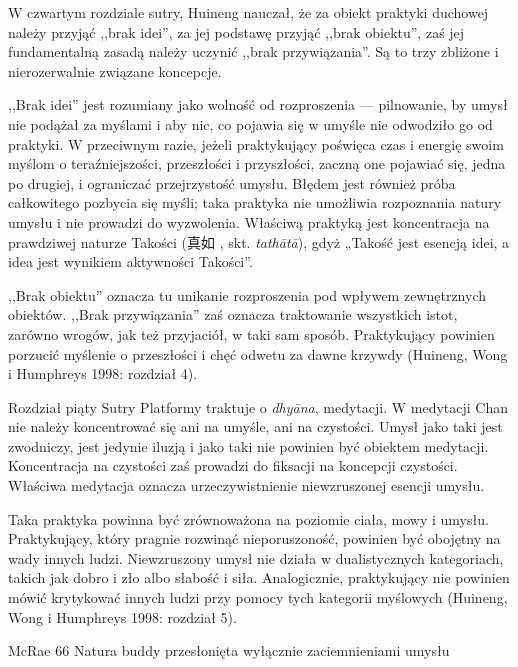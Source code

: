 W czwartym rozdziale sutry, Huineng nauczał, że za obiekt praktyki duchowej należy przyjąć ,,brak idei'', za jej podstawę przyjąć ,,brak obiektu'', zaś jej fundamentalną zasadą należy uczynić ,,brak przywiązania''. Są to trzy zbliżone i nierozerwalnie związane koncepcje.

,,Brak idei'' jest rozumiany jako wolność od rozproszenia --- pilnowanie, by umysł nie podążał za myślami i aby nic, co pojawia się w umyśle nie odwodziło go od praktyki. W przeciwnym razie, jeżeli praktykujący poświęca czas i energię swoim myślom o teraźniejszości, przeszłości i przyszłości, zaczną one pojawiać się, jedna po drugiej, i ograniczać przejrzystość umysłu. Błędem jest również próba całkowitego pozbycia się myśli; taka praktyka nie umożliwia rozpoznania natury umysłu i nie prowadzi do wyzwolenia. Właściwą praktyką jest koncentracja na prawdziwej naturze Takości (真如 , skt. \textit{tathātā}), gdyż „Takość jest esencją idei, a idea jest wynikiem aktywności Takości”.

,,Brak obiektu'' oznacza tu unikanie rozproszenia pod wpływem zewnętrznych obiektów. ,,Brak przywiązania'' zaś oznacza traktowanie wszystkich istot, zarówno wrogów, jak też przyjaciół, w taki sam sposób. Praktykujący powinien porzucić myślenie o przeszłości i chęć odwetu za dawne krzywdy (Huineng, Wong i Humphreys 1998: rozdział 4).

Rozdział piąty Sutry Platformy traktuje o \textit{dhyāna}, medytacji. W medytacji Chan nie należy koncentrować się ani na umyśle, ani na czystości. Umysł jako taki jest zwodniczy, jest jedynie iluzją i jako taki nie powinien być obiektem medytacji. Koncentracja na czystości zaś prowadzi do fiksacji na koncepcji czystości. Właściwa medytacja oznacza urzeczywistnienie niewzruszonej esencji umysłu.

Taka praktyka powinna być zrównoważona na poziomie ciała, mowy i umysłu. Praktykujący, który pragnie rozwinąć nieporuszoność, powinien być obojętny na wady innych ludzi. Niewzruszony umysł nie działa w dualistycznych kategoriach, takich jak dobro i zło albo słabość i siła. Analogicznie, praktykujący nie powinien mówić krytykować innych ludzi przy pomocy tych kategorii myślowych (Huineng, Wong i Humphreys 1998: rozdział 5).

McRae 66
Natura buddy przesłonięta wyłącznie zaciemnieniami umysłu
\fi
